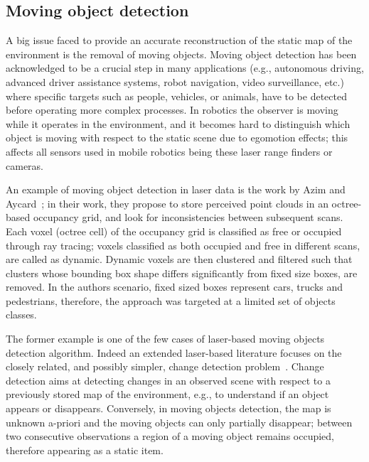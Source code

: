 \subsection{Moving object detection}
A big issue faced to provide an accurate reconstruction of the static map of the environment is the removal of moving objects.
Moving object detection has been acknowledged to be a crucial step in many applications (e.g., autonomous driving, advanced driver assistance systems, robot navigation, video surveillance, etc.) where specific targets such as  people, vehicles, or animals, have to be detected before operating more complex processes.
In robotics the observer is moving while it operates in the environment, and it becomes hard to distinguish which object is moving with respect to the static scene due to egomotion effects; this affects all sensors used in mobile robotics being these laser range finders or cameras.


An example of moving object detection in laser data is the work by Azim and Aycard~\cite{azim2012detection}; in their work, they propose to store perceived point clouds in an octree-based occupancy grid, and look for inconsistencies between subsequent scans. Each voxel (octree cell) of the occupancy grid is classified as free or occupied through ray tracing; voxels classified as both occupied and free in different scans, are called as dynamic. 
Dynamic voxels are then clustered and filtered such that clusters whose bounding box shape differs significantly from fixed size boxes, are removed. In the authors scenario, fixed sized boxes represent cars, trucks and pedestrians, therefore, the approach was targeted at a limited set of objects classes.

The former example is one of the few cases of laser-based moving objects detection algorithm. Indeed an extended laser-based literature focuses on the closely related, and possibly simpler, change detection problem~\cite{vieira2014spatial,andreasson2007has,drews2013fast,xiao2013change}.
Change detection  aims at detecting changes in an observed scene with respect to a previously stored map of the environment, e.g., to understand if an object appears or disappears. 
Conversely, in moving objects detection, the map is unknown a-priori and the moving objects can only partially disappear; between two consecutive observations a region of a moving object remains occupied, therefore appearing as a static item.

